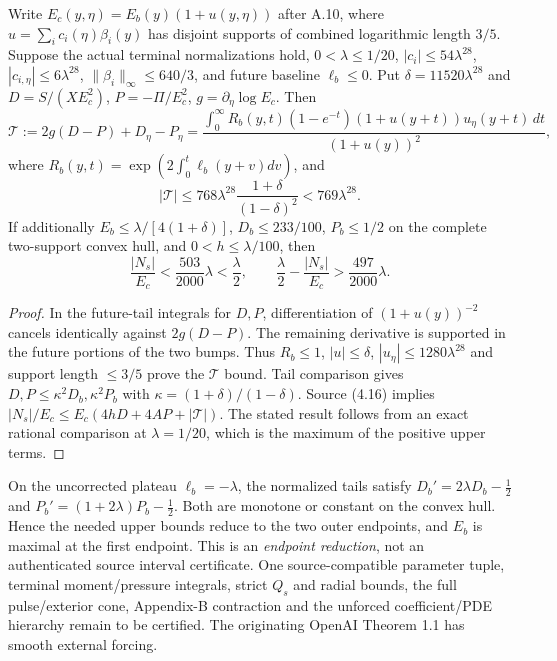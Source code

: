 \begin{theorem}
\label{thm:A11-parity-tail-improvement-20261021}
Write $E_c(y,\eta)=E_b(y)(1+u(y,\eta))$ after A.10, where
$u=\sum_i c_i(\eta)\beta_i(y)$ has disjoint supports of combined
logarithmic length $3/5$. Suppose the actual terminal
normalizations hold, $0<\lambda\le1/20$,
$|c_i|\le54\lambda^{28}$,
$|c_{i,\eta}|\le6\lambda^{28}$,
$\|\beta_i\|_\infty\le640/3$, and future baseline
$\ell_b\le0$. Put $\delta=11520\lambda^{28}$ and
$D=S/(XE_c^2)$, $P=-\Pi/E_c^2$,
$g=\partial_\eta\log E_c$. Then
\[
\mathcal T:=2g(D-P)+D_\eta-P_\eta
=\frac{\int_0^\infty R_b(y,t)(1-e^{-t})
(1+u(y+t))u_\eta(y+t)\,dt}{(1+u(y))^2},
\]
where $R_b(y,t)=\exp(2\int_0^t\ell_b(y+v)dv)$, and
\[
|\mathcal T|\le768\lambda^{28}
 \frac{1+\delta}{(1-\delta)^2}<769\lambda^{28}.
\]
If additionally $E_b\le\lambda/[4(1+\delta)]$,
$D_b\le233/100$, $P_b\le1/2$ on the complete
two-support convex hull, and $0<h\le\lambda/100$, then
\[
\frac{|N_s|}{E_c}<\frac{503}{2000}\lambda<\frac\lambda2,
\qquad
\frac\lambda2-\frac{|N_s|}{E_c}>
\frac{497}{2000}\lambda.
\]
\end{theorem}
\begin{proof}
In the future-tail integrals for $D,P$, differentiation
of $(1+u(y))^{-2}$ cancels identically against $2g(D-P)$.
The remaining derivative is supported in the future portions
of the two bumps. Thus $R_b\le1$,
$|u|\le\delta$, $|u_\eta|\le1280\lambda^{28}$
and support length $\le3/5$ prove the $\mathcal T$ bound.
Tail comparison gives $D,P\le\kappa^2 D_b,\kappa^2 P_b$
with $\kappa=(1+\delta)/(1-\delta)$. Source (4.16) implies
$|N_s|/E_c\le E_c(4hD+4AP+|\mathcal T|)$.
The stated result follows from an exact rational comparison
at $\lambda=1/20$, which is the maximum of the positive
upper terms.
\end{proof}

On the uncorrected plateau $\ell_b=-\lambda$,
the normalized tails satisfy
$D_b'=2\lambda D_b-\frac12$ and
$P_b'=(1+2\lambda)P_b-\frac12$.
Both are monotone or constant on the convex hull. Hence the
needed upper bounds reduce to the two outer endpoints,
and $E_b$ is maximal at the first endpoint. This is an
\emph{endpoint reduction}, not an authenticated source interval
certificate. One source-compatible parameter tuple, terminal
moment/pressure integrals, strict $Q_s$ and radial bounds,
the full pulse/exterior cone, Appendix-B contraction and the
unforced coefficient/PDE hierarchy remain to be certified.
The originating OpenAI Theorem 1.1 has smooth external forcing.
